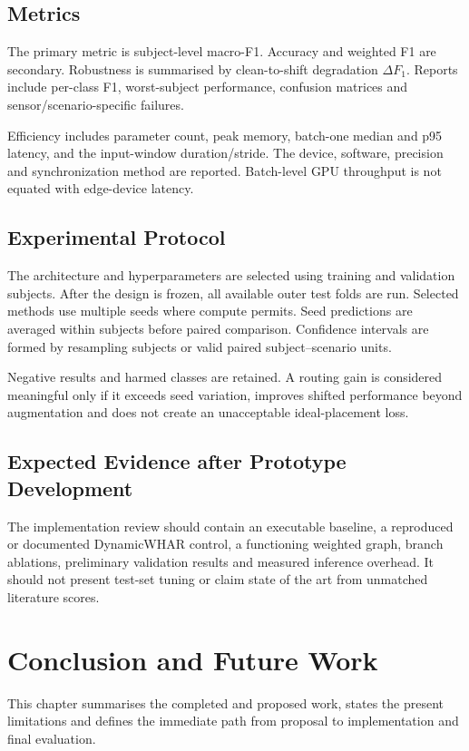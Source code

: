 \documentclass[12pt,a4paper,twoside,openright]{report}
\begin{document}
\section{Metrics}
The primary metric is subject-level macro-F1. Accuracy and weighted F1 are secondary. Robustness is summarised by clean-to-shift degradation $\Delta F_1$. Reports include per-class F1, worst-subject performance, confusion matrices and sensor/scenario-specific failures.

Efficiency includes parameter count, peak memory, batch-one median and p95 latency, and the input-window duration/stride. The device, software, precision and synchronization method are reported. Batch-level GPU throughput is not equated with edge-device latency.

\section{Experimental Protocol}
The architecture and hyperparameters are selected using training and validation subjects. After the design is frozen, all available outer test folds are run. Selected methods use multiple seeds where compute permits. Seed predictions are averaged within subjects before paired comparison. Confidence intervals are formed by resampling subjects or valid paired subject--scenario units.

Negative results and harmed classes are retained. A routing gain is considered meaningful only if it exceeds seed variation, improves shifted performance beyond augmentation and does not create an unacceptable ideal-placement loss.

\section{Expected Evidence after Prototype Development}
The implementation review should contain an executable baseline, a reproduced or documented DynamicWHAR control, a functioning weighted graph, branch ablations, preliminary validation results and measured inference overhead. It should not present test-set tuning or claim state of the art from unmatched literature scores.

\cleardoublepage
\chapter{Conclusion and Future Work}

This chapter summarises the completed and proposed work, states the present limitations and defines the immediate path from proposal to implementation and final evaluation.
\end{document}
